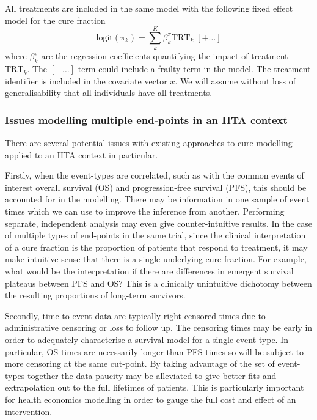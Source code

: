 \documentclass[AMA,STIX1COL]{WileyNJD-v2}
\begin{document}
All treatments are included in the same model with the following fixed effect model for the cure fraction
\begin{equation}
\label{eqn:pi_regn}
\mbox{logit}(\pi_k) = \sum_k^K \beta^{\pi}_k \mbox{TRT}_k \;[+ \ldots]
\end{equation}
\noindent
where $\beta^{\pi}_k$ are the regression coefficients quantifying the impact of treatment $\mbox{TRT}_k$.
The $[+ \ldots]$ term could include a frailty term in the model.
The treatment identifier is included in the covariate vector $x$.
We will assume without loss of generalisability that all individuals have all treatments.

\subsubsection{Issues modelling multiple end-points in an HTA context}
There are several potential issues with existing approaches to cure modelling applied to an HTA context in particular.

Firstly, when the event-types are correlated, such as with the common events of interest overall survival (OS) and progression-free survival (PFS), this should be accounted for in the modelling.
There may be information in one sample of event times which we can use to improve the inference from another.
Performing separate, independent analysis may even give counter-intuitive results.
In the case of multiple types of end-points in the same trial, since the clinical interpretation of a cure fraction is the proportion of patients that respond to treatment,
it may make intuitive sense that there is a single underlying cure fraction.
For example, what would be the interpretation if there are differences in emergent survival plateaus between PFS and OS?
This is a clinically unintuitive dichotomy between the resulting proportions of long-term survivors.

Secondly, time to event data are typically right-censored times due to administrative censoring or loss to follow up.
The censoring times may be early in order to adequately characterise a survival model for a single event-type.
In particular, OS times are necessarily longer than PFS times so will be subject to more censoring at the same cut-point.
By taking advantage of the set of event-types together the data paucity may be alleviated to give better fits and extrapolation out to the full lifetimes of patients.
This is particularly important for health economics modelling in order to gauge the full cost and effect of an intervention.
\end{document}
